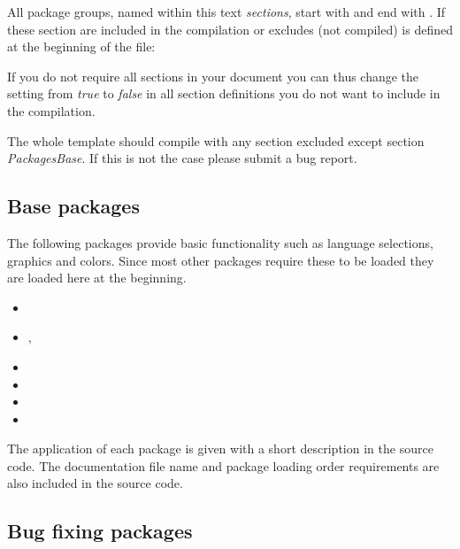 All package groups, named within this text \emph{sections}, start with  and end with . If these section are included in the compilation or excludes (not compiled) is defined at the beginning of the file:


If you do not require all sections in your document you can thus change the setting from \emph{true} to \emph{false} in all section definitions you do not want to include in the compilation.

The whole template should compile with any section excluded except section \emph{PackagesBase}. If this is not the case please submit a bug report.

\subsection{Base packages}
\label{sec:packages:base}
The following packages provide basic functionality such as language selections, graphics and colors. Since most other packages require these to be loaded they are loaded here at the beginning. 

\begin{itemize}[noitemsep]
\item {}
\item {}, 
\item {}
\item {}
\item {}
\item {}
\end{itemize}

The application of each package is given with a short description in the source code. The documentation file name and package loading order requirements are also included in the source code. 


\subsection{Bug fixing packages}


